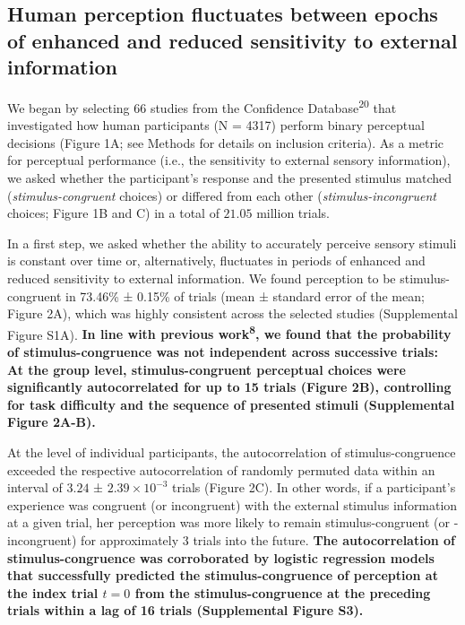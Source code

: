 \documentclass[
]{article}
\begin{document}
\hypertarget{human-perception-fluctuates-between-epochs-of-enhanced-and-reduced-sensitivity-to-external-information}{%
\subsection{Human perception fluctuates between epochs of enhanced and
reduced sensitivity to external
information}\label{human-perception-fluctuates-between-epochs-of-enhanced-and-reduced-sensitivity-to-external-information}}

We began by selecting 66 studies from the Confidence
Database\textsuperscript{20} that investigated how human participants (N
= 4317) perform binary perceptual decisions (Figure 1A; see Methods for
details on inclusion criteria). As a metric for perceptual performance
(i.e., the sensitivity to external sensory information), we asked
whether the participant's response and the presented stimulus matched
(\emph{stimulus-congruent} choices) or differed from each other
(\emph{stimulus-incongruent} choices; Figure 1B and C) in a total of
\(21.05\) million trials.

In a first step, we asked whether the ability to accurately perceive
sensory stimuli is constant over time or, alternatively, fluctuates in
periods of enhanced and reduced sensitivity to external information. We
found perception to be stimulus-congruent in 73.46\% ± 0.15\% of trials
(mean ± standard error of the mean; Figure 2A), which was highly
consistent across the selected studies (Supplemental Figure S1A).
\textbf{In line with previous work\textsuperscript{8}, we found that the
probability of stimulus-congruence was not independent across successive
trials: At the group level, stimulus-congruent perceptual choices were
significantly autocorrelated for up to 15 trials (Figure 2B),
controlling for task difficulty and the sequence of presented stimuli
(Supplemental Figure 2A-B).}

At the level of individual participants, the autocorrelation of
stimulus-congruence exceeded the respective autocorrelation of randomly
permuted data within an interval of \(3.24\) ±
\(\ensuremath{2.39\times 10^{-3}}\) trials (Figure 2C). In other words,
if a participant's experience was congruent (or incongruent) with the
external stimulus information at a given trial, her perception was more
likely to remain stimulus-congruent (or -incongruent) for approximately
3 trials into the future. \textbf{The autocorrelation of
stimulus-congruence was corroborated by logistic regression models that
successfully predicted the stimulus-congruence of perception at the
index trial \(t = 0\) from the stimulus-congruence at the preceding
trials within a lag of 16 trials (Supplemental Figure S3).}
\end{document}
